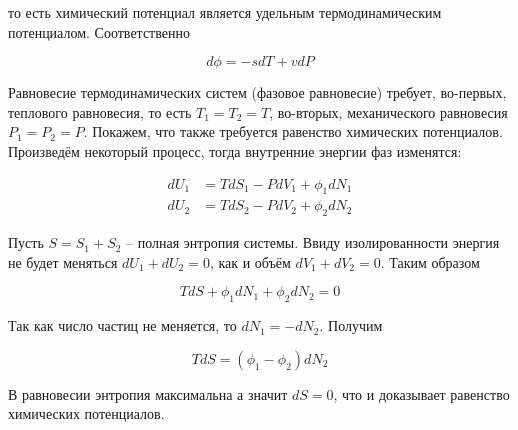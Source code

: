 \noindent
то есть химический потенциал является удельным термодинамическим потенциалом. Соответственно

\begin{equation}
    d \phi = - s dT + v dP
\end{equation}

Равновесие термодинамических систем (фазовое равновесие) требует, во-первых, теплового равновесия, то есть $T_1 = T_2 = T$, во-вторых, механического равновесия $P_1 = P_2 =P$. Покажем, что также требуется равенство химических потенциалов. Произведём некоторый процесс, тогда внутренние энергии фаз изменятся:

\begin{align*}
    dU_1 &= T dS_1 - P dV_1 + \phi_1 dN_1 \\
    dU_2 &= T dS_2 - P dV_2 + \phi_2 dN_2
\end{align*}

\noindent
Пусть $S = S_1 + S_2$ -- полная энтропия системы. Ввиду изолированности энергия не будет меняться $dU_1 + dU_2 = 0$, как и объём $dV_1 + dV_2 = 0$. Таким образом

\begin{equation*}
    T dS + \phi_1 dN_1 + \phi_2 dN_2 = 0
\end{equation*}

\noindent
Так как число частиц не меняется, то $dN_1 = - dN_2$. Получим

\begin{equation*}
    T dS = \left( \phi_1 - \phi_2 \right) dN_2
\end{equation*}

\noindent
В равновесии энтропия максимальна а значит $dS = 0$, что и доказывает равенство химических потенциалов. 